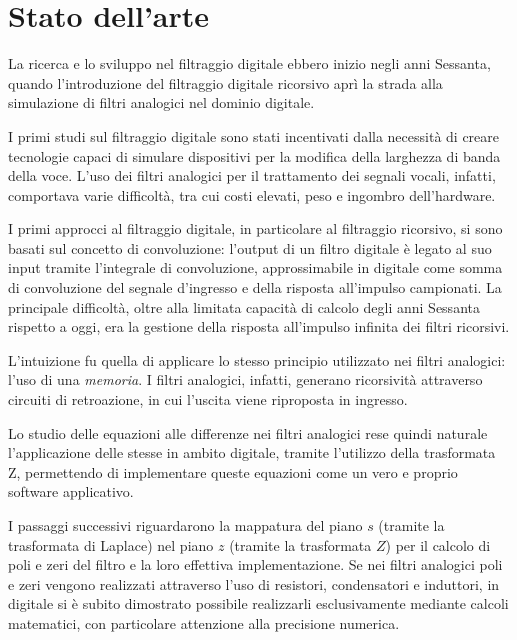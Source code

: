 \documentclass[12pt]{report}
\begin{document}
%
%

\chapter{Stato dell'arte}
\label{chap:stato_arte}
La ricerca e lo sviluppo nel filtraggio digitale ebbero inizio negli anni Sessanta, quando l’introduzione del filtraggio digitale ricorsivo aprì la strada alla simulazione di filtri analogici nel dominio digitale.

I primi studi sul filtraggio digitale sono stati incentivati dalla necessità di creare tecnologie capaci di simulare dispositivi per la modifica della larghezza di banda della voce. L'uso dei filtri analogici per il trattamento dei segnali vocali, infatti, comportava varie difficoltà, tra cui costi elevati, peso e ingombro dell'hardware.

I primi approcci al filtraggio digitale, in particolare al filtraggio ricorsivo, si sono basati sul concetto di convoluzione: l’output di un filtro digitale è legato al suo input tramite l’integrale di convoluzione, approssimabile in digitale come somma di convoluzione del segnale d’ingresso e della risposta all’impulso campionati. La principale difficoltà, oltre alla limitata capacità di calcolo degli anni Sessanta rispetto a oggi, era la gestione della risposta all'impulso infinita dei filtri ricorsivi.

L’intuizione fu quella di applicare lo stesso principio utilizzato nei filtri analogici: l’uso di una \textit{memoria}. I filtri analogici, infatti, generano ricorsività attraverso circuiti di retroazione, in cui l’uscita viene riproposta in ingresso.

Lo studio delle equazioni alle differenze nei filtri analogici rese quindi naturale l’applicazione delle stesse in ambito digitale, tramite l'utilizzo della trasformata Z, permettendo di implementare queste equazioni come un vero e proprio software applicativo.

I passaggi successivi riguardarono la mappatura del piano \( s \) (tramite la trasformata di Laplace) nel piano \( z \) (tramite la trasformata \( Z \)) per il calcolo di poli e zeri del filtro e la loro effettiva implementazione. Se nei filtri analogici poli e zeri vengono realizzati attraverso l’uso di resistori, condensatori e induttori, in digitale si è subito dimostrato possibile realizzarli esclusivamente mediante calcoli matematici, con particolare attenzione alla precisione numerica.
\end{document}
